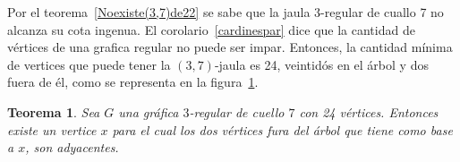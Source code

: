 \documentclass[12pt]{book}
\newtheorem{theorem}{Teorema}
\theoremstyle{definition}
\begin{document}
Por el teorema~\ref{Noexiste(3,7)de22} se sabe que la jaula $3$-regular
de cuallo 7 no alcanza su cota ingenua. El corolario~\ref{cardinespar} dice que la cantidad de vértices de
una grafica regular no
puede ser impar. Entonces, la cantidad mínima de vertices que puede
tener la $(3,7)$-jaula es 24, veintidós en el árbol y dos fuera de él,
como se representa en la figura~\ref{arbol(3,7)mas2}.


\begin{figure}
  \centering
  \caption{} \label{arbol(3,7)mas2}
\end{figure}



\begin{theorem}
Sea $G$ una gráfica $3$-regular de cuello $7$ con 24
vértices. Entonces existe un vertice $x$ para el cual los dos vértices
fura del árbol que tiene como base a $x$, son adyacentes.
\end{theorem}
\end{document}
